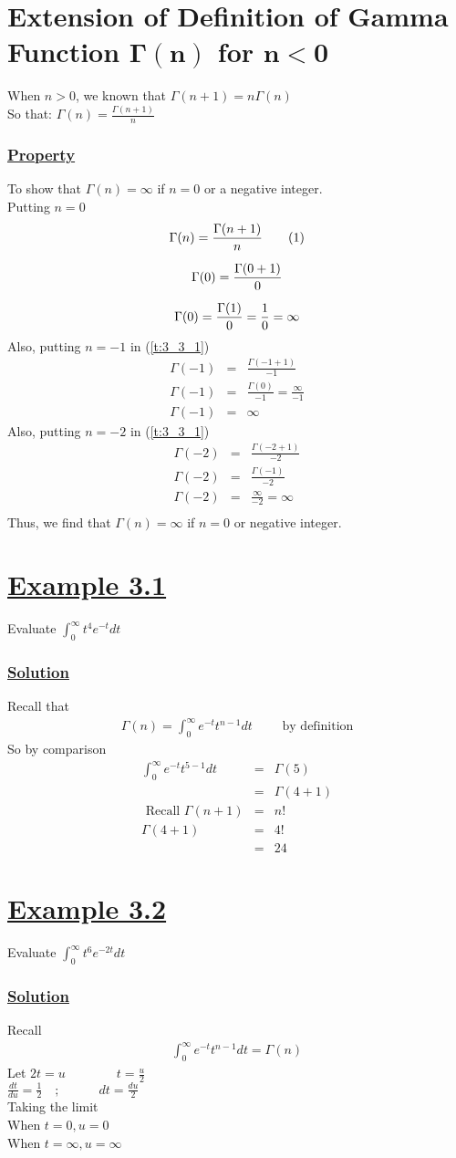 \documentclass[11pt]{report}
\newcommand{\ubt}[1]{\textbf{\underline{#1}}}
\newcommand{\sps}{\\[0.2cm]}
\newcommand{\refn}[1]{(\ref{#1})}
\newcommand{\dsp}{\displaystyle}
\newcommand{\mbf}[1]{\mathbf{#1}}
\newcommand{\example}[1]{\section*{\ubt{Example #1}}}
\newcommand{\property}{\subsubsection{\ubt{Property}}}
\newcommand{\solution}{\subsubsection{\ubt{Solution}}}
\begin{document}
	
	\section{Extension of Definition of Gamma Function $\mbf{\Gamma(n)}$ for $\mbf{n<0}$}
	
	When $n>0$, we known that $\Gamma(n+1) = n\Gamma(n)$\\
	So that: $\dsp \Gamma(n) = \frac{\Gamma(n+1)}{n}$
	
	\property
	To show that $\Gamma(n) = \infty$ if $n=0$ or a negative integer.\sps
	Putting $n=0$
	\begin{gather}
		\Gamma(n) = \frac{\Gamma(n+1)}{n}\tag{1}\label{t:3_3_1}\sps
		\Gamma(0) = \frac{\Gamma(0+1)}{0}\notag\sps
		\Gamma(0) = \frac{\Gamma(1)}{0} = \frac{1}{0} = \infty\notag
	\end{gather}
	Also, putting $n=-1$ in \refn{t:3_3_1}
	\begin{eqnarray*}
		\Gamma(-1) &=& \frac{\Gamma(-1+1)}{-1}\sps
		\Gamma(-1) &=& \frac{\Gamma(0)}{-1} = \frac{\infty}{-1}\sps
		\Gamma(-1) &=& \infty
	\end{eqnarray*}
	Also, putting $n=-2$ in \refn{t:3_3_1}
	\begin{eqnarray*}
		\Gamma(-2) &=& \frac{\Gamma(-2+1)}{-2}\sps
		\Gamma(-2) &=& \frac{\Gamma(-1)}{-2}\sps
		\Gamma(-2) &=& \frac{\infty}{-2} = \infty\\
	\end{eqnarray*}
	Thus, we find that $\Gamma(n) = \infty$ if $n=0$ or negative integer.
	
	
	\example{3.1}
	Evaluate $\dsp\int_0^\infty t^4e^{-t}dt$
	
	\solution
	Recall that
	\begin{eqnarray*}
		\Gamma(n) = \int_0^\infty e^{-t}t^{n-1}dt\qquad \text{ by definition}
	\end{eqnarray*}
	So by comparison
	\begin{eqnarray*}
		\int_0^\infty e^{-t}t^{5-1}dt &=& \Gamma(5)\sps
		&=&\Gamma(4+1)\sps
		\text{ Recall } \Gamma(n+1) &=& n!\sps
		\Gamma(4+1) &=& 4!\sps
		&=& 24
	\end{eqnarray*}
	
	\example{3.2}
	Evaluate $\dsp\int_0^\infty t^6e^{-2t}dt$
	
	\solution
	Recall
	\begin{eqnarray*}
		\int_0^\infty e^{-t}t^{n-1}dt = \Gamma(n)
	\end{eqnarray*}
	Let $\dsp 2t = u\qquad\qquad t = \frac{u}{2}$\sps
	$\dsp\frac{dt}{du}=\frac{1}{2}\quad ; \qquad \quad dt = \frac{du}{2}$\sps
	Taking the limit\\
	When $t=0, u=0$\\
	When $t=\infty, u=\infty$
	
\end{document}
